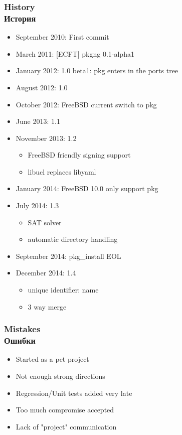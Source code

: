 \begin{frame}
	\frametitle{History \\ История}
	\begin{itemize}
		\item September 2010: First commit
		\item March 2011:  [ECFT] pkgng 0.1-alpha1
		\item January 2012: 1.0 beta1: pkg enters in the ports tree
		\item August 2012: 1.0
		\item October 2012: FreeBSD current switch to pkg
		\item June 2013: 1.1
		\item November 2013: 1.2
			\begin{itemize}
				\item FreeBSD friendly signing support
				\item libucl replaces libyaml
			\end{itemize}
		\item January 2014: FreeBSD 10.0 only support pkg
		\item July 2014: 1.3
			\begin{itemize}
				\item SAT solver
				\item automatic directory handling
			\end{itemize}
		\item September 2014: pkg\_install EOL
		\item December 2014: 1.4
			\begin{itemize}
				\item unique identifier: name
				\item 3 way merge
			\end{itemize}
	\end{itemize}
\end{frame}

\begin{frame}
	\frametitle{Mistakes \\ Ошибки}
	\begin{itemize}
		\item Started as a pet project
		\item Not enough strong directions
		\item Regression/Unit tests added very late
		\item Too much compromise accepted
		\item Lack of "project" communication
	\end{itemize}
\end{frame}

